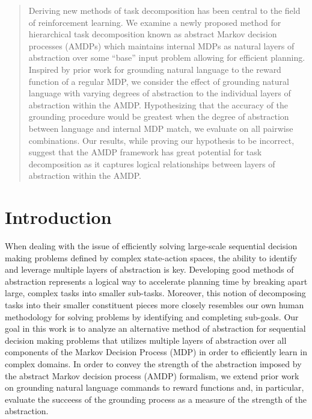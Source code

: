 \documentclass[conference]{IEEEtran}
\begin{document}
\maketitle

\begin{abstract}
Deriving new methods of task decomposition has been central to the field of reinforcement learning. We examine a newly proposed method for hierarchical task decomposition known as abstract Markov decision processes (AMDPs) which maintains internal MDPs as natural layers of abstraction over some ``base'' input problem allowing for efficient planning. Inspired by prior work for grounding natural language to the reward function of a regular MDP, we consider the effect of grounding natural language with varying degrees of abstraction to the individual layers of abstraction within the AMDP. Hypothesizing that the accuracy of the grounding procedure would be greatest when the degree of abstraction between language and internal MDP match, we evaluate on all pairwise combinations. Our results, while proving our hypothesis to be incorrect, suggest that the AMDP framework has great potential for task decomposition as it captures logical relationships between layers of abstraction within the AMDP.
\end{abstract}

\IEEEpeerreviewmaketitle

\section{Introduction}
When dealing with the issue of efficiently solving large-scale sequential decision making problems defined by complex state-action spaces, the ability to identify and leverage multiple layers of abstraction is key. Developing good methods of abstraction represents a logical way to accelerate planning time by breaking apart large, complex tasks into smaller sub-tasks. Moreover, this notion of decomposing tasks into their smaller constituent pieces more closely resembles our own human methodology for solving problems by identifying and completing sub-goals. Our goal in this work is to analyze an alternative method of abstraction for sequential decision making problems that utilizes multiple layers of abstraction over all components of the Markov Decision Process (MDP) in order to efficiently learn in complex domains. In order to convey the strength of the abstraction imposed by the abstract Markov decision process (AMDP) formalism, we extend prior work on grounding natural language commands to reward functions and, in particular, evaluate the succeess of the grounding process as a measure of the strength of the abstraction.
\end{document}
